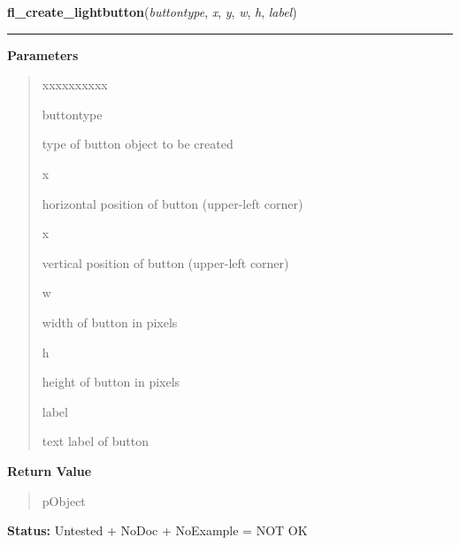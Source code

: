     \label{xformslib:library:fl_create_lightbutton}

    \vspace{0.5ex}

\hspace{.8\funcindent}\begin{boxedminipage}{\funcwidth}

    \raggedright \textbf{fl\_create\_lightbutton}(\textit{buttontype}, \textit{x}, \textit{y}, \textit{w}, \textit{h}, \textit{label})

    \vspace{-1.5ex}

    \rule{\textwidth}{0.5\fboxrule}
\setlength{\parskip}{2ex}
\setlength{\parskip}{1ex}
      \textbf{Parameters}
      \vspace{-1ex}

      \begin{quote}
        \begin{Ventry}{xxxxxxxxxx}

          \item[buttontype]

          type of button object to be created

          \item[x]

          horizontal position of button (upper-left corner)

          \item[x]

          vertical position of button (upper-left corner)

          \item[w]

          width of button in pixels

          \item[h]

          height of button in pixels

          \item[label]

          text label of button

        \end{Ventry}

      \end{quote}

      \textbf{Return Value}
    \vspace{-1ex}

      \begin{quote}
      pObject

      \end{quote}

\textbf{Status:} Untested + NoDoc + NoExample = NOT OK



    \end{boxedminipage}

